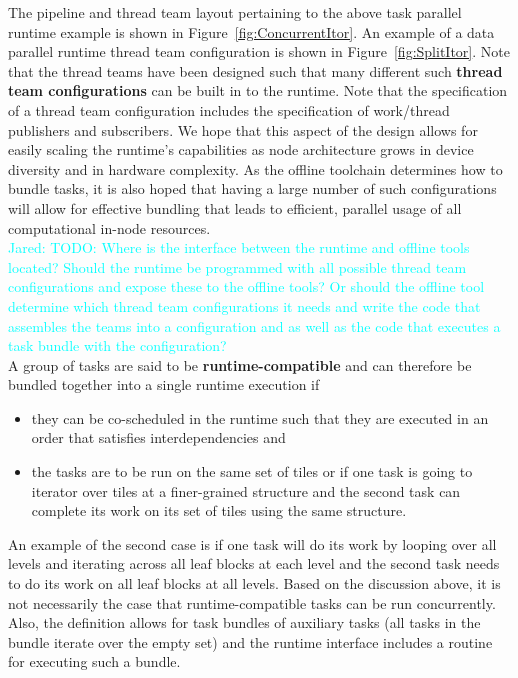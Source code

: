 \documentclass{article}
\newcommand{\Jared}[1]          {\textcolor{cyan}{Jared: #1}}
\begin{document}
The pipeline and thread team layout pertaining to the above task parallel
runtime example is shown in Figure~\ref{fig:ConcurrentItor}.  An example of a
data parallel runtime thread team configuration is shown in
Figure~\ref{fig:SplitItor}.  Note that the thread teams have been designed such
that many different such \textbf{thread team configurations} can be built in to the
runtime.  Note that the specification of a thread team configuration includes the
specification of work/thread publishers and subscribers.  We hope that this
aspect of the design allows for easily scaling the runtime's capabilities as
node architecture grows in device diversity and in hardware complexity.  As the
offline toolchain determines how to bundle tasks, it is also hoped that having a
large number of such configurations will allow for effective bundling that leads
to efficient, parallel usage of all computational in-node resources.\\

\Jared{TODO: Where is the interface between the runtime and offline tools
located?  Should the runtime be programmed with all possible thread team
configurations and expose these to the offline tools?  Or should the offline
tool determine which thread team configurations it needs and write the code that
assembles the teams into a configuration and as well as the code that executes a
task bundle with the configuration?}\\

A group of tasks are said to be \textbf{runtime-compatible} and can therefore be
bundled together into a single runtime execution if
\begin{itemize}
\item{they can be co-scheduled in the runtime such that they are executed in an
order that satisfies interdependencies and}
\item{the tasks are to be run on the same set of tiles or if one task is going
to iterator over tiles at a finer-grained structure and the second task can
complete its work on its set of tiles using the same structure.}
\end{itemize}
An example of the second case is if one task
will do its work by looping over all levels and iterating across all leaf blocks
at each level and the second task needs to do its work on all leaf blocks at all
levels.  Based on the discussion above, it is not necessarily the case that
runtime-compatible tasks can be run concurrently.  Also, the definition allows
for task bundles of auxiliary tasks (all tasks in the bundle iterate over the
empty set) and the runtime interface includes a routine for executing such a
bundle.\\
\end{document}
